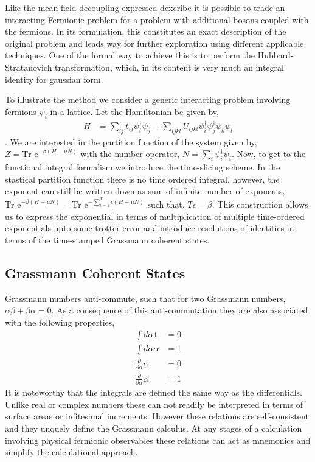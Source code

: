 \documentclass[notitlepage,onecolumn,showpacs,11pt]{revtex4-1}
\begin{document}
Like the mean-field decoupling expressed dexcribe it is possible to trade an interacting 
Fermionic problem for a problem with additional bosons coupled with the fermions. In its 
formulation, this constitutes an exact description of the original problem and leads way 
for further exploration using different applicable techniques. One of the formal way to 
achieve this is to perform the Hubbard-Stratanovich transformation, which, in its content 
is very much an integral identity for gaussian form. 

To illustrate the method we consider a generic interacting problem involving fermions 
$\psi_i$ in a lattice. Let the Hamiltonian be given by,
\begin{equation}\label{eq:hubbard-hamiltonian}
	\begin{aligned}
		H&=\sum_{ij}t_{ij}\psi^\dagger_i\psi_j+\sum_{ijkl}U_{ijkl}\psi^\dagger_{i}
		\psi^\dagger_{j}\psi_k\psi_l
	\end{aligned}
\end{equation}
. We are interested in the partition function of the system given by, 
$Z=\text{Tr e}^{-\beta \left(H -\mu N\right)}$ with the number operator, 
$ N=\sum_{i}\psi^\dagger_i\psi_i$. Now, to get to the functional integral formalism we 
introduce the time-slicing scheme. In the stastical partition function there is no time 
ordered integral, however, the exponent can still be written down as sum of infinite number 
of exponents, 
$\text{Tr e}^{-\beta \left(H -\mu N\right)}
=\text{Tr e}^{-\sum^{T}_{t=1} \epsilon\left(H -\mu N\right)}$ such that, $ T\epsilon=\beta $. 
This construction allows us to express the exponential in terms of multiplication of multiple
time-ordered exponentials upto some trotter error and introduce resolutions of identities 
in terms of the time-stamped Grassmann coherent states.
\subsection{Grassmann Coherent States}

Grassmann numbers anti-commute, such that for two Grassmann numbers, $\alpha\beta+\beta\alpha=0$. 
As a consequence of this anti-commutation they are also associated with the following properties,
\begin{equation}
	\begin{aligned}
		\int d\alpha 1&=0 \\
		\int d\alpha \alpha&=1 \\
		\frac{\partial}{\partial\alpha} \alpha&=0 \\
		\frac{\partial}{\partial\alpha} \alpha&=1
	\end{aligned}
\end{equation}
It is noteworthy that the integrals are defined the same way as the differentials. Unlike 
real or complex numbers these can not readily be interpreted in terms of surface areas or
infitesimal increments. However these relations are self-consistent and they unquely 
define the Grassmann calculus. At any stages of a calculation involving physical fermionic 
observables these relations can act as mnemonics and simplify the calculational approach.
\end{document}
